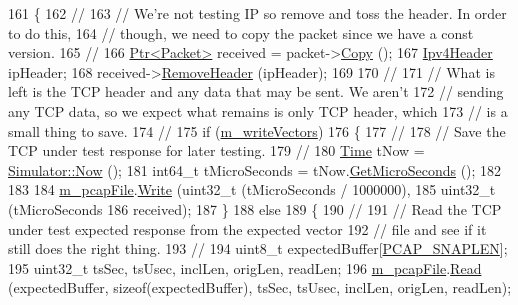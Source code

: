 \begin{DoxyCode}
161 \{
162   \textcolor{comment}{//}
163   \textcolor{comment}{// We're not testing IP so remove and toss the header.  In order to do this,}
164   \textcolor{comment}{// though, we need to copy the packet since we have a const version.}
165   \textcolor{comment}{//}
166   \hyperlink{classns3_1_1Ptr}{Ptr<Packet>} received = packet->\hyperlink{classns3_1_1Packet_a5d5c70802a5f77fc5f0001e0cfc1898b}{Copy} ();
167   \hyperlink{classns3_1_1Ipv4Header}{Ipv4Header} ipHeader;
168   received->\hyperlink{classns3_1_1Packet_a0961eccf975d75f902d40956c93ba63e}{RemoveHeader} (ipHeader);
169 
170   \textcolor{comment}{//}
171   \textcolor{comment}{// What is left is the TCP header and any data that may be sent.  We aren't}
172   \textcolor{comment}{// sending any TCP data, so we expect what remains is only TCP header, which}
173   \textcolor{comment}{// is a small thing to save.}
174   \textcolor{comment}{//}
175   \textcolor{keywordflow}{if} (\hyperlink{classNs3TcpLossTestCase_a6b4ff8445b57a44939392bb79b00d963}{m\_writeVectors})
176     \{
177       \textcolor{comment}{//}
178       \textcolor{comment}{// Save the TCP under test response for later testing.}
179       \textcolor{comment}{//}
180       \hyperlink{classns3_1_1Time}{Time} tNow = \hyperlink{group__simulator_gac3635e2e87f7ce316c89290ee1b01d0d}{Simulator::Now} ();
181       int64\_t tMicroSeconds = tNow.\hyperlink{classns3_1_1Time_a2542b9273c336da11fcaf54e8bc6e4c8}{GetMicroSeconds} ();
182 
183 
184       \hyperlink{classNs3TcpLossTestCase_a6a02dbbf853025b7fe39393c1e1195ae}{m\_pcapFile}.\hyperlink{classns3_1_1PcapFile_a3920f5bae95ca0021875e6e9c2630ccf}{Write} (uint32\_t (tMicroSeconds / 1000000),
185                         uint32\_t (tMicroSeconds %
186                         received);
187     \}
188   \textcolor{keywordflow}{else}
189     \{
190       \textcolor{comment}{//}
191       \textcolor{comment}{// Read the TCP under test expected response from the expected vector}
192       \textcolor{comment}{// file and see if it still does the right thing.}
193       \textcolor{comment}{//}
194       uint8\_t expectedBuffer[\hyperlink{ns3tcp-loss-test-suite_8cc_ae9a6b49b98d0c7917dda456f6771d2e1}{PCAP\_SNAPLEN}];
195       uint32\_t tsSec, tsUsec, inclLen, origLen, readLen;
196       \hyperlink{classNs3TcpLossTestCase_a6a02dbbf853025b7fe39393c1e1195ae}{m\_pcapFile}.\hyperlink{classns3_1_1PcapFile_a18c5045735408fe45a8cbc9e6b34a4fb}{Read} (expectedBuffer, \textcolor{keyword}{sizeof}(expectedBuffer), tsSec, tsUsec, inclLen, 
      origLen, readLen);

\end{DoxyCode}
